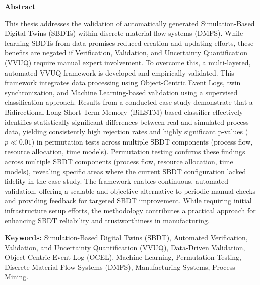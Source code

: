 \thispagestyle{plain}

\vspace*{1.5in}

\begin{center}
  {\Large \textbf{Abstract}}
\end{center}

This thesis addresses the validation of automatically generated Simulation-Based Digital Twins (SBDTs) within discrete material flow systems (DMFS). While learning SBDTs from data promises reduced creation and updating efforts, these benefits are negated if Verification, Validation, and Uncertainty Quantification (VVUQ) require manual expert involvement. To overcome this, a multi-layered, automated VVUQ framework is developed and empirically validated. This framework integrates data processing using Object-Centric Event Logs, twin synchronization, and Machine Learning-based validation using a supervised classification approach. Results from a conducted case study demonstrate that a Bidirectional Long Short-Term Memory (BiLSTM)-based classifier effectively identifies statistically significant differences between real and simulated process data, yielding consistently high rejection rates and highly significant p-values ($p \ll 0.01$) in permutation tests across multiple SBDT components (process flow, resource allocation, time models). Permutation testing confirms these findings across multiple SBDT components (process flow, resource allocation, time models), revealing specific areas where the current SBDT configuration lacked fidelity in the case study. The framework enables continuous, automated validation, offering a scalable and objective alternative to periodic manual checks and providing feedback for targeted SBDT improvement. While requiring initial infrastructure setup efforts, the methodology contributes a practical approach for enhancing SBDT reliability and trustworthiness in manufacturing.

\vspace{0.3in}

\textbf{Keywords:} Simulation-Based Digital Twins (SBDT), Automated Verification, Validation, and Uncertainty Quantification (VVUQ), Data-Driven Validation, Object-Centric Event Log (OCEL), Machine Learning, Permutation Testing, Discrete Material Flow Systems (DMFS), Manufacturing Systems, Process Mining.

\clearpage